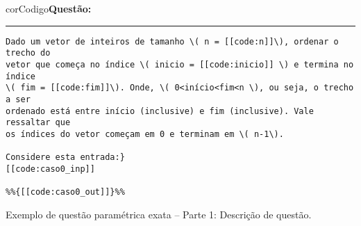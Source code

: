 \begin{listing}[!ht]
\begin{myboxCode}{corCodigo}{\textbf{Questão: }}\vspace{3mm}
\hrule
\begin{verbatim}
Dado um vetor de inteiros de tamanho \( n = [[code:n]]\), ordenar o trecho do 
vetor que começa no índice \( inicio = [[code:inicio]] \) e termina no índice 
\( fim = [[code:fim]]\). Onde, \( 0<início<fim<n \), ou seja, o trecho a ser
ordenado está entre início (inclusive) e fim (inclusive). Vale ressaltar que 
os índices do vetor começam em 0 e terminam em \( n-1\). 

Considere esta entrada:} 
[[code:caso0_inp]]

%%{[[code:caso0_out]]}%%
\end{verbatim}
\end{myboxCode}
\caption{Exemplo de questão paramétrica exata -- Parte 1: Descrição de questão.}
\label{lst:questaoQT_Exata_1_parte1}
\end{listing}

